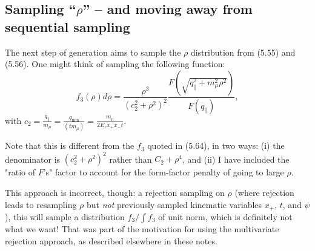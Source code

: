 \documentclass[11pt]{article}
\newcommand{\be}{\begin{equation}}
\newcommand{\ee}{\end{equation}}
\newcommand{\pal}{\parallel}
\begin{document}
\subsection{Sampling ``$\rho$'' -- and moving away from sequential sampling}
The next step of generation aims to sample the $\rho$ distribution from  (5.55) and (5.56).  One might think of sampling the following function:
\be
f_3(\rho) d\rho = \frac{\rho^3}{(c_2^2 + \rho^2)^2} \frac{F(\sqrt{q_\pal^2 + m_\mu^2 \rho^2})}{F(q_\pal)},
\ee
with $c_2 =\frac {q_\pal} {m_\mu} =  \frac{q_{\min}}{(t m_\mu)} = \frac{m_\mu }{2 E_\gamma x_+ x_- t}$.

Note that this is different from the $f_3$ quoted in (5.64), in two ways: (i) the denominator is $(c_2^2 + \rho^2)^2$ rather than $C_2 +\rho^4$, and (ii) I have included the "ratio of $F$'s" factor to account for the form-factor penalty of going to large $\rho$.

This approach is incorrect, though: a rejection sampling on $\rho$ (where rejection leads to resampling $\rho$ but \emph{not} previously sampled kinematic variables $x_+$, $t$, and $\psi$), this will sample a distribution $f_3/\int f_3$  of unit norm, which is definitely not what we want! That was part of the motivation for using the multivariate rejection approach, as described elsewhere in these notes. 

%
%
%
%
\end{document}
